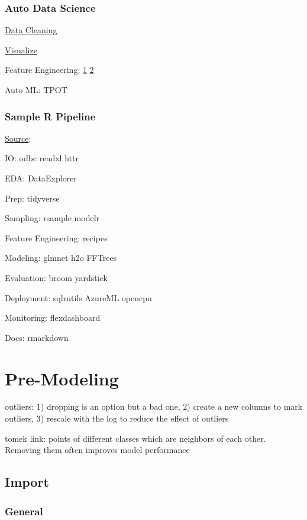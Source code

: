\documentclass[]{book}
\begin{document}
\subsection{Auto Data Science}\label{auto-data-science}

\href{http://www.dataland.ai/index.php}{Data Cleaning}

\href{http://holoviews.org}{Visualize}

Feature Engineering: \href{https://www.featuretools.com}{1} \textbar{}
\href{https://www.featurelabs.com/}{2}

Auto ML: TPOT

\subsection{Sample R Pipeline}\label{sample-r-pipeline}

\href{https://mobile.twitter.com/TheStephLocke/status/990251709531344896}{Source}:

IO: odbc readxl httr

EDA: DataExplorer

Prep: tidyverse

Sampling: rsample modelr

Feature Engineering: recipes

Modeling: glmnet h2o FFTrees

Evaluation: broom yardstick

Deployment: sqlrutils AzureML opencpu

Monitoring: flexdashboard

Docs: rmarkdown

\chapter{Pre-Modeling}\label{pre-modeling}

outliers: 1) dropping is an option but a bad one, 2) create a new
columns to mark outliers, 3) rescale with the log to reduce the effect
of outliers

tomek link: points of different classes which are neighbors of each
other. Removing them often improves model performance

\section{Import}\label{import-1}

\subsection{General}\label{general-1}
\end{document}
